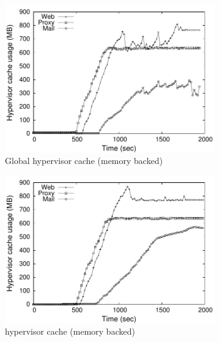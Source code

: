 \begin{figure}[t]
\centering
\begin{subfigure}{0.38\textwidth} 
\includegraphics[width=\textwidth]{data/correctness/musage_global_new} 
 \caption{Global hypervisor cache (memory backed)}
 \label{fig:globalmem} 
\end{subfigure} 
%
\begin{subfigure}{0.38\textwidth}
\includegraphics[width=\textwidth]{data/correctness/musage_ddecker_new} 
 \caption{\dd{} hypervisor cache (memory backed)}
 \label{fig:ddeckermem} 
\end{subfigure} 
%
\begin{subfigure}{0.38\textwidth}

\end{subfigure}
\end{figure}

